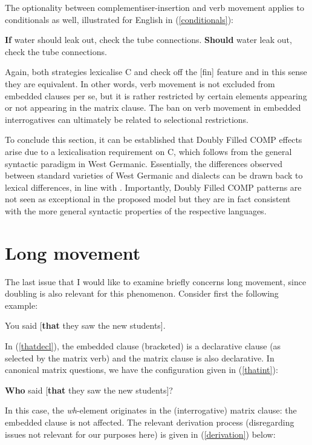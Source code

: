 The optionality between complementiser-insertion and verb movement applies to conditionals as well, illustrated for English in (\ref{conditionals}):

\ea \label{conditionals}
\ea \textbf{If} water should leak out, check the tube connections.
\ex \textbf{Should} water leak out, check the tube connections.
\z
\z

Again, both strategies lexicalise C and check off the [fin] feature and in this sense they are equivalent. In other words, verb movement is not excluded from embedded clauses per se, but it is rather restricted by certain elements appearing or not appearing in the matrix clause. The ban on verb movement in embedded interrogatives can ultimately be related to selectional restrictions.

To conclude this section, it can be established that Doubly Filled COMP effects arise due to a lexicalisation requirement on C, which follows from the general syntactic paradigm in West Germanic. Essentially, the differences observed between standard varieties of West Germanic and dialects can be drawn back to lexical differences, in line with \citet{borer1984}. Importantly, Doubly Filled COMP patterns are not seen as exceptional in the proposed model but they are in fact consistent with the more general syntactic properties of the respective languages.

\section{Long movement} \label{sec:3long}
The last issue that I would like to examine briefly concerns long movement, since doubling is also relevant for this phenomenon. Consider first the following example:

\ea You said [\textbf{that} they saw the new students]. \label{thatdecl}
\z

In (\ref{thatdecl}), the embedded clause (bracketed) is a declarative clause (as selected by the matrix verb) and the matrix clause is also declarative. In canonical matrix questions, we have the configuration given in (\ref{thatint}):

\ea \textbf{Who} said [\textbf{that} they saw the new students]? \label{thatint}
\z

In this case, the \textit{wh}-element originates in the (interrogative) matrix clause: the embedded clause is not affected. The relevant derivation process (disregarding issues not relevant for our purposes here) is given in (\ref{derivation}) below:


